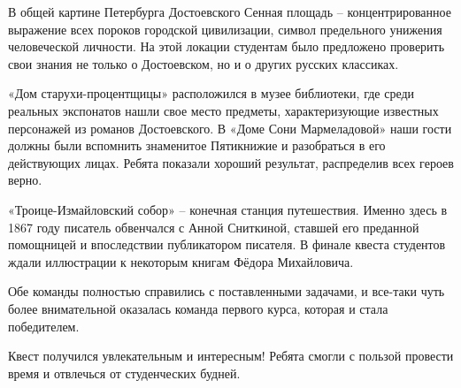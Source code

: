 В общей картине Петербурга Достоевского Сенная площадь – концентрированное
выражение всех пороков городской цивилизации, символ предельного унижения
человеческой личности. На этой локации студентам было предложено проверить свои
знания не только о Достоевском, но и о других русских классиках.


«Дом старухи-процентщицы» расположился в музее библиотеки, где среди реальных
экспонатов нашли свое место предметы, характеризующие известных персонажей из
романов Достоевского. В «Доме Сони Мармеладовой» наши гости должны были
вспомнить знаменитое Пятикнижие и разобраться в его действующих лицах. Ребята
показали хороший результат, распределив всех героев верно.

«Троице-Измайловский собор» – конечная станция путешествия. Именно здесь в 1867
году писатель обвенчался с Анной Сниткиной, ставшей его преданной помощницей и
впоследствии публикатором писателя. В финале квеста студентов ждали иллюстрации
к некоторым книгам Фёдора Михайловича.

Обе команды полностью справились с поставленными задачами, и все-таки чуть
более внимательной оказалась команда первого курса, которая и стала
победителем.

Квест получился увлекательным и интересным! Ребята смогли с пользой провести
время и отвлечься от студенческих будней. 
